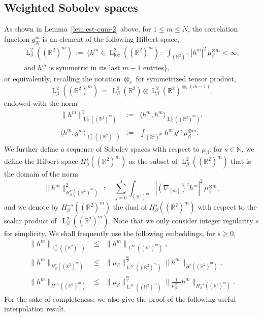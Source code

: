 \documentclass[a4paper,11pt,reqno,noindent]{amsart}
\theoremstyle{plain}
\numberwithin{equation}{section}
\newcommand{\R}{\mathbb R}
\newcommand{\loc}{{\operatorname{loc}}}
\newcommand{\3}{|\!|\!|}
\newcommand{\Ld}{\operatorname{L}}
\begin{document}
\subsection{Weighted Sobolev spaces}\label{sec:def-weight-Sob}
As shown in Lemma~\ref{lem:est-cum-2} above, for $1\le m\le N$, the correlation function $g_N^{m}$ is an element of the following Hilbert space,
\begin{multline*}
\Ld^2_\beta((\R^2)^{m})\,:=\,\Big\{h^{m}\in\Ld^2_\loc((\R^2)^{m})~:~\int_{(\R^2)^{m}}|h^{m}|^2\,\mu_\beta^{\otimes m}<\infty,\\
\text{and $h^m$ is symmetric in its last $m-1$ entries}\Big\},
\end{multline*}
or equivalently, recalling the notation $\otimes_s$ for symmetrized tensor product,
\[\Ld^2_\beta((\R^2)^{m})\,=\,\Ld^2_\beta(\R^2)\otimes\Ld^2_\beta(\R^2)^{\otimes_s(m-1)},\]
endowed with the norm
\begin{eqnarray*}
\|h^m\|_{\Ld^2_\beta((\R^2)^m)}^2&:=&\langle h^m,h^m\rangle_{\Ld^2_\beta((\R^2)^m)},\\
\langle h^m,g^m\rangle_{\Ld^2_\beta((\R^2)^m)}&:=&\int_{(\R^2)^m}\overline{h^m}\,g^m\,\mu_\beta^{\otimes m}.
\end{eqnarray*}
We further define a sequence of Sobolev spaces with respect to $\mu_\beta$: for $s\in \mathbb{N}$, we define the Hilbert space $H^s_\beta((\R^2)^m)$ as the subset of $\Ld^2_\beta((\R^2)^m)$ that is the domain of the norm
\begin{equation}\label{eq:Hsbeta}
\|h^m\|_{H^s_\beta((\R^2)^m)}^2\,:=\,\sum_{j=0}^s\int_{(\R^2)^m}|(\nabla_{{[m]}})^jh^m|^2\,\mu_\beta^{\otimes m},
\end{equation}
and we denote by $H^{-s}_\beta((\R^2)^m)$ the dual of $H^s_\beta((\R^2)^m)$ with respect to the scalar product of~$\Ld^2_\beta((\R^2)^m)$.
Note that we only consider integer regularity $s$ for simplicity.
We shall frequently use the following embeddings, for $s\ge0$,
\begin{eqnarray}
\|h^m\|_{\Ld^2_\beta((\R^2)^m)}&\le&\|h^m\|_{\Ld^\infty((\R^2)^m)},\nonumber\\
\|h^m\|_{H^{s}_\beta((\R^2)^m)}&\le&\|\mu_\beta\|_{\Ld^\infty((\R^2)^m)}^{\frac m2}\|h^m\|_{H^{s}((\R^2)^m)},\nonumber\\
\|h^m\|_{H^{-s}((\R^2)^m)}&\le&\|\mu_\beta\|_{\Ld^\infty((\R^2)^m)}^{\frac m2}\big\|\tfrac1{\mu_\beta^{\otimes m}}h^m\big\|_{H^{-s}_\beta((\R^2)^m)}.\label{eq:embeddingHs}
\end{eqnarray}
For the sake of completeness, we also give the proof of the following useful interpolation result.
\end{document}
